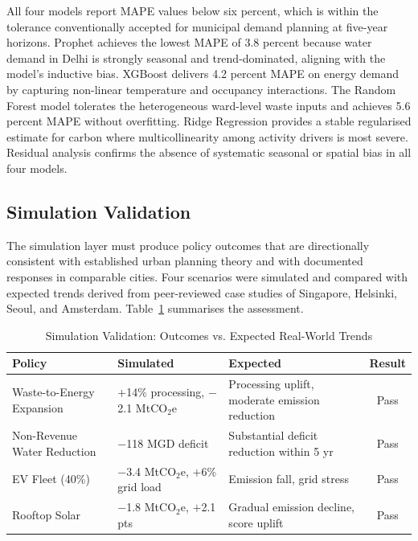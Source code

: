 \documentclass[conference]{IEEEtran}
\begin{document}
All four models report MAPE values below six percent, which is within
the tolerance conventionally accepted for municipal demand planning at
five-year horizons. Prophet achieves the lowest MAPE of 3.8 percent
because water demand in Delhi is strongly seasonal and trend-dominated,
aligning with the model's inductive bias. XGBoost delivers 4.2 percent
MAPE on energy demand by capturing non-linear temperature and occupancy
interactions. The Random Forest model tolerates the heterogeneous
ward-level waste inputs and achieves 5.6 percent MAPE without
overfitting. Ridge Regression provides a stable regularised estimate for
carbon where multicollinearity among activity drivers is most severe.
Residual analysis confirms the absence of systematic seasonal or spatial
bias in all four models.

\subsection{Simulation Validation}

The simulation layer must produce policy outcomes that are directionally
consistent with established urban planning theory and with documented
responses in comparable cities. Four scenarios were simulated and
compared with expected trends derived from peer-reviewed case studies
of Singapore, Helsinki, Seoul, and Amsterdam. Table~\ref{tab:simval}
summarises the assessment.

\begin{table}[htbp]
\caption{Simulation Validation: Outcomes vs. Expected Real-World Trends}
\label{tab:simval}
\begin{center}
\begin{tabular}{|p{2.0cm}|p{2.2cm}|p{2.0cm}|c|}
\hline
\textbf{Policy} & \textbf{Simulated} & \textbf{Expected} &
\textbf{Result} \\
\hline
Waste-to-Energy Expansion &
  $+$14\% processing, $-$2.1 MtCO$_2$e &
  Processing uplift, moderate emission reduction &
  Pass \\
\hline
Non-Revenue Water Reduction &
  $-$118 MGD deficit &
  Substantial deficit reduction within 5 yr &
  Pass \\
\hline
EV Fleet (40\%) &
  $-$3.4 MtCO$_2$e, $+$6\% grid load &
  Emission fall, grid stress &
  Pass \\
\hline
Rooftop Solar &
  $-$1.8 MtCO$_2$e, $+$2.1 pts &
  Gradual emission decline, score uplift &
  Pass \\
\hline
\end{tabular}
\end{center}
\end{table}
\end{document}

